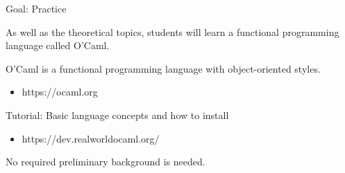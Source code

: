 \documentclass[table]{beamer}
\begin{document}
\begin{frame}[t]{Goal: Practice} \vspace{10pt}

As well as the theoretical topics, students will learn a functional programming language called O'Caml. 

\vspace{10pt}

O'Caml is a functional programming language with object-oriented styles.
\begin{itemize}
\item https://ocaml.org
\end{itemize}

\vspace{10pt}

Tutorial: Basic language concepts and how to install
\begin{itemize}
\item https://dev.realworldocaml.org/
\end{itemize}

\vspace{10pt}

No required preliminary background is needed.

\end{frame}
\end{document}
